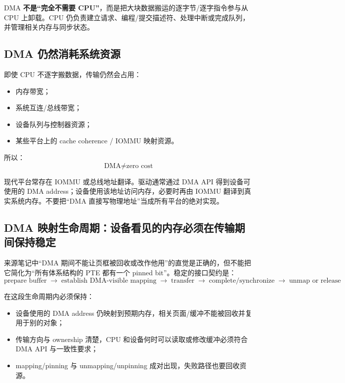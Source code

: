 \documentclass[UTF8,fontset=fandol,11pt,a4paper]{ctexart}
\newcommand{\kw}[1]{\textbf{#1}}
\newcommand{\arr}{\;\longrightarrow\;}
\begin{document}
\begin{statebox}
DMA \kw{不是“完全不需要 CPU”}，而是把大块数据搬运的逐字节/逐字指令参与从 CPU 上卸载。CPU 仍负责建立请求、编程/提交描述符、处理中断或完成队列，并管理相关内存与同步状态。
\end{statebox}

\subsection{DMA 仍然消耗系统资源}
即使 CPU 不逐字搬数据，传输仍然会占用：
\begin{itemize}
  \item 内存带宽；
  \item 系统互连/总线带宽；
  \item 设备队列与控制器资源；
  \item 某些平台上的 cache coherence / IOMMU 映射资源。
\end{itemize}
所以：
\[
\boxed{\text{DMA}\neq\text{zero cost}}
\]

\begin{eng}
现代平台常存在 IOMMU 或总线地址翻译。驱动通常通过 DMA API 得到设备可使用的 DMA address；设备使用该地址访问内存，必要时再由 IOMMU 翻译到真实系统内存。不要把“DMA 直接写物理地址”当成所有平台的绝对实现。
\end{eng}

\subsection{DMA 映射生命周期：设备看见的内存必须在传输期间保持稳定}

来源笔记中“DMA 期间不能让页框被回收或改作他用”的直觉是正确的，但不能把它简化为“所有体系结构的 PTE 都有一个 pinned bit”。稳定的接口契约是：
\[
\boxed{
\text{prepare buffer}
\arr\text{establish DMA-visible mapping}
\arr\text{transfer}
\arr\text{complete/synchronize}
\arr\text{unmap or release}
}
\]

在这段生命周期内必须保持：
\begin{itemize}
  \item 设备使用的 DMA address 仍映射到预期内存，相关页面/缓冲不能被回收并复用于别的对象；
  \item 传输方向与 ownership 清楚，CPU 和设备何时可以读取或修改缓冲必须符合 DMA API 与一致性要求；
  \item mapping/pinning 与 unmapping/unpinning 成对出现，失败路径也要回收资源。
\end{itemize}
\end{document}
